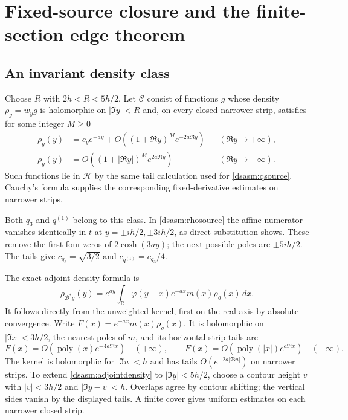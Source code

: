 \documentclass[11pt,letterpaper]{article}
\theoremstyle{remark}\newtheorem{remark}[theorem]{Remark}
\newcommand{\R}{\mathbb R}\newcommand{\C}{\mathbb C}\newcommand{\N}{\mathbb N}
\begin{document}
\section{Fixed-source closure and the finite-section edge theorem}\label{dsasm:sec:edge}
\subsection{An invariant density class}
Choose $R$ with $2h<R<5h/2$. Let $\mathcal C$ consist of functions
$g$ whose density $\rho_g=w_yg$ is holomorphic on $|\Im y|<R$ and,
on every closed narrower strip, satisfies for some integer $M\ge0$
\begin{align}
 \rho_g(y)&=c_ge^{-ay}+O((1+\Re y)^Me^{-2a\Re y})
                                  &&(\Re y\to+\infty),\label{dsasm:densityclass}\\
 \rho_g(y)&=O((1+|\Re y|)^Me^{2a\Re y})
                                  &&(\Re y\to-\infty).\nonumber
\end{align}
Such functions lie in $\mathcal H$ by the same tail calculation
used for \eqref{dsasm:qsource}. Cauchy's formula supplies the corresponding
fixed-derivative estimates on narrower strips.

Both $q_3$ and $q^{(1)}$ belong to this class. In
\eqref{dsasm:rhosource} the affine numerator vanishes identically in $t$
at $y=\pm ih/2,\pm3ih/2$, as direct substitution shows. These
remove the first four zeros of $2\cosh(3ay)$; the next possible
poles are $\pm5ih/2$. The tails give
$c_{q_3}=\sqrt{3/2}$ and $c_{q^{(1)}}=c_{q_3}/4$.

The exact adjoint density formula is
\begin{equation}\label{dsasm:adjointdensity}
 \rho_{\mathcal B^*g}(y)
   =e^{ay}\int_\R\varphi(y-x)e^{-ax}m(x)\rho_g(x)\,dx.
\end{equation}
It follows directly from the unweighted kernel, first on the real
axis by absolute convergence. Write $F(x)=e^{-ax}m(x)\rho_g(x)$.
It is holomorphic on $|\Im x|<3h/2$, the nearest poles of $m$,
and its horizontal-strip tails are
\[
 F(x)=O(\operatorname{poly}(x)e^{-4a\Re x})\quad(+\infty),\qquad
 F(x)=O(\operatorname{poly}(|x|)e^{a\Re x})\quad(-\infty).
\]
The kernel is holomorphic for $|\Im u|<h$ and has tails
$O(e^{-2a|\Re u|})$ on narrower strips. To extend
\eqref{dsasm:adjointdensity} to $|\Im y|<5h/2$, choose a contour height
$v$ with $|v|<3h/2$ and $|\Im y-v|<h$. Overlaps agree by contour
shifting; the vertical sides vanish by the displayed tails.
A finite cover gives uniform estimates on each narrower closed strip.
\end{document}
